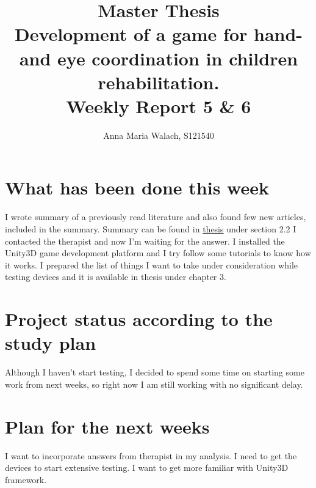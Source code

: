\documentclass[10pt,a4paper]{article}
\title{{Master Thesis\\[0.5em]}
       {\bf \huge Development of a game for hand- and eye coordination in children rehabilitation.\\[0.5em]}
       {\bf Weekly Report 5 \& 6}}
\author{Anna Maria Walach, S121540}
\begin{document}
\maketitle

\section*{What has been done this week}
I wrote summary of a previously read literature and also found few new articles, included in the summary. Summary can be found in \href{https://github.com/yahirah/masther-thesis/blob/master/thesis/Thesis.pdf}{thesis} under section 2.2
I contacted the therapist and now I'm waiting for the answer.
I installed the Unity3D \cite{unity} game development platform and I try follow some tutorials to know how it works.
I prepared the list of things I want to take under consideration while testing devices and it is available in thesis under chapter 3. 


\section*{Project status according to the study plan}
Although I haven't start testing, I decided to spend some time on starting some work from next weeks, so right now I am still working with no significant delay.

\section*{Plan for the next weeks}
I want to incorporate answers from therapist in my analysis.
I need to get the devices to start extensive testing.
I want to get more familiar with Unity3D framework.
 

\end{document}

